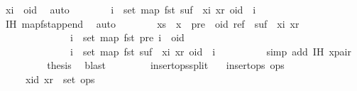 \begin{isabellebody}
\ {\isacartoucheopen}xi\ {\isasymnoteq}\ oid{\isacartoucheclose}\ \isamarkupfalse%
\ auto\isanewline
\ \ \ \ \ \ \isamarkupfalse%
\ {\isachardoublequoteopen}{\isasymforall}i\ {\isasymin}\ set\ {\isacharparenleft}map\ fst\ {\isacharparenleft}suf\ {\isacharat}\ {\isacharbrackleft}{\isacharparenleft}xi{\isacharcomma}\ xr{\isacharparenright}{\isacharbrackright}{\isacharparenright}{\isacharparenright}{\isachardot}\ oid\ {\isacharless}\ i{\isachardoublequoteclose}\isanewline
\ \ \ \ \ \ \ \ \isamarkupfalse%
\ IH\ map{\isacharunderscore}fst{\isacharunderscore}append{}\ \isamarkupfalse%
\ auto\isanewline
\ \ \ \ \ \ \isamarkupfalse%
\ {\isachardoublequoteopen}xs\ {\isacharat}\ {\isacharbrackleft}x{\isacharbrackright}\ {\isacharequal}\ pre\ {\isacharat}\ {\isacharbrackleft}{\isacharparenleft}oid{\isacharcomma}\ ref{\isacharparenright}{\isacharbrackright}\ {\isacharat}\ {\isacharparenleft}suf\ {\isacharat}\ {\isacharbrackleft}{\isacharparenleft}xi{\isacharcomma}\ xr{\isacharparenright}{\isacharbrackright}{\isacharparenright}\ {\isasymand}\isanewline
\ \ \ \ \ \ \ \ \ \ \ \ \ \ {\isacharparenleft}{\isasymforall}i\ {\isasymin}\ set\ {\isacharparenleft}map\ fst\ pre{\isacharparenright}{\isachardot}\ i\ {\isacharless}\ oid{\isacharparenright}\ {\isasymand}\isanewline
\ \ \ \ \ \ \ \ \ \ \ \ \ \ {\isacharparenleft}{\isasymforall}i\ {\isasymin}\ set\ {\isacharparenleft}map\ fst\ {\isacharparenleft}suf\ {\isacharat}\ {\isacharbrackleft}{\isacharparenleft}xi{\isacharcomma}\ xr{\isacharparenright}{\isacharbrackright}{\isacharparenright}{\isacharparenright}{\isachardot}\ oid\ {\isacharless}\ i{\isacharparenright}{\isachardoublequoteclose}\isanewline
\ \ \ \ \ \ \ \ \isamarkupfalse%
\ {\isacharparenleft}simp\ add{\isacharcolon}\ IH\ x{\isacharunderscore}pair{\isacharparenright}\isanewline
\ \ \ \ \ \ \isamarkupfalse%
\ \isamarkupfalse%
\ {\isacharquery}thesis\ \isamarkupfalse%
\ blast\isanewline
\ \ \ \ \isamarkupfalse%
\isanewline
\ \ \isamarkupfalse%
\isanewline
{}\isamarkupfalse%
%
\endisatagproof
{\isafoldproof}%
%
\isadelimproof
\isanewline
%
\endisadelimproof
\isanewline
{}\isamarkupfalse%
\ insert{\isacharunderscore}ops{\isacharunderscore}split{\isacharunderscore}{}{\isacharcolon}\isanewline
\ \ \ {\isachardoublequoteopen}insert{\isacharunderscore}ops\ ops{\isachardoublequoteclose}\isanewline
\ \ \ \ \ {\isachardoublequoteopen}{\isacharparenleft}xid{\isacharcomma}\ xr{\isacharparenright}\ {\isasymin}\ set\ ops{\isachardoublequoteclose}\isanewline

\end{isabellebody}
